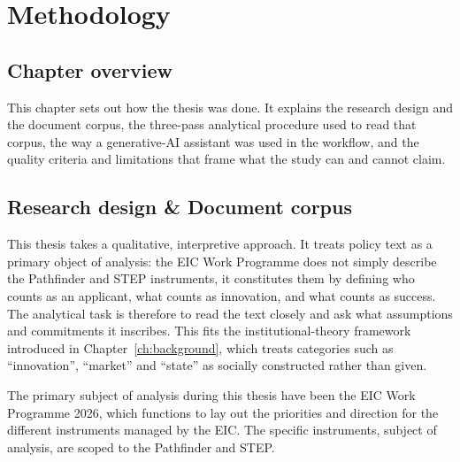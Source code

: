 %
\chapter{Methodology}
\label{ch:methodology}

\section*{Chapter overview}

This chapter sets out how the thesis was done. It explains the research
design and the document corpus, the three-pass analytical procedure used
to read that corpus, the way a generative-AI assistant was used in the
workflow, and the quality criteria and limitations that frame what the
study can and cannot claim.

\section{Research design \& Document corpus}
\label{sec:meth-corpus}

This thesis takes a qualitative, interpretive approach. It treats policy
text as a primary object of analysis: the EIC Work Programme does not
simply describe the Pathfinder and STEP instruments, it constitutes them
by defining who counts as an applicant, what counts as innovation, and
what counts as success. The analytical task is therefore to read the
text closely and ask what assumptions and commitments it inscribes. This
fits the institutional-theory framework introduced in
Chapter~\ref{ch:background}, which treats categories such as
\enquote{innovation}, \enquote{market} and \enquote{state} as socially
constructed rather than given.

The primary subject of analysis during this thesis have been the EIC
Work Programme 2026, which functions to lay out the priorities and
direction for the different instruments managed by the EIC. The specific
instruments, subject of analysis, are scoped to the Pathfinder and STEP.
\\

